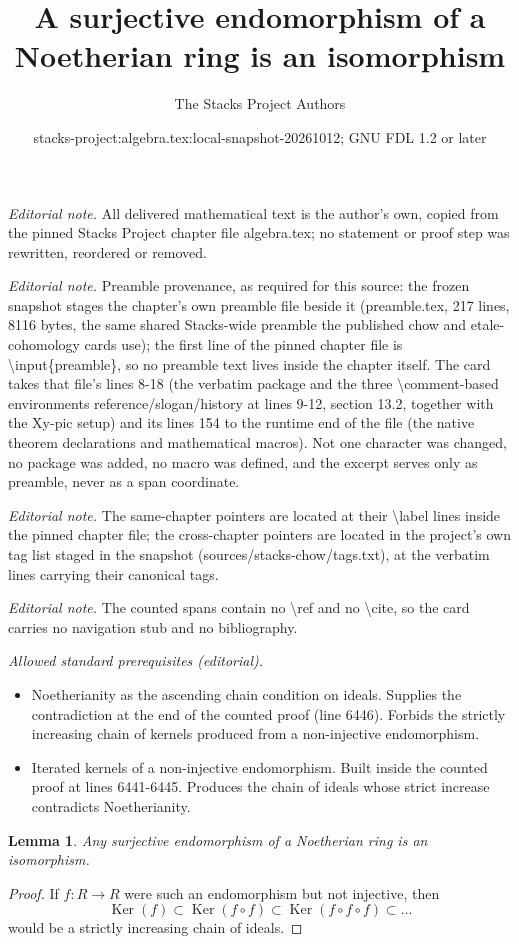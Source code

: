 \documentclass[10pt,a4paper]{amsart}
\title{A surjective endomorphism of a Noetherian ring is an isomorphism}
\author{The Stacks Project Authors}
\date{stacks-project:algebra.tex:local-snapshot-20261012; GNU FDL 1.2 or later}
\theoremstyle{plain}
\newtheorem{lemma}[subsection]{Lemma}
\theoremstyle{definition}
\theoremstyle{remark}
\numberwithin{equation}{subsection}
\def\Ker{\mathop{\mathrm{Ker}}}
\begin{document}
\maketitle
\noindent\textit{Editorial note.} All delivered mathematical text is the author's own, copied from the pinned Stacks Project chapter file algebra.tex; no statement or proof step was rewritten, reordered or removed.\par\medskip
\noindent\textit{Editorial note.} Preamble provenance, as required for this source: the frozen snapshot stages the chapter's own preamble file beside it (preamble.tex, 217 lines, 8116 bytes, the same shared Stacks-wide preamble the published chow and etale-cohomology cards use); the first line of the pinned chapter file is \textbackslash{}input\{preamble\}, so no preamble text lives inside the chapter itself. The card takes that file's lines 8-18 (the verbatim package and the three \textbackslash{}comment-based environments reference/slogan/history at lines 9-12, section 13.2, together with the Xy-pic setup) and its lines 154 to the runtime end of the file (the native theorem declarations and mathematical macros). Not one character was changed, no package was added, no macro was defined, and the excerpt serves only as preamble, never as a span coordinate.\par\medskip
\noindent\textit{Editorial note.} The same-chapter pointers are located at their \textbackslash{}label lines inside the pinned chapter file; the cross-chapter pointers are located in the project's own tag list staged in the snapshot (sources/stacks-chow/tags.txt), at the verbatim lines carrying their canonical tags.\par\medskip
\noindent\textit{Editorial note.} The counted spans contain no \textbackslash{}ref and no \textbackslash{}cite, so the card carries no navigation stub and no bibliography.\par\medskip
\noindent\textit{Allowed standard prerequisites (editorial).}\begin{itemize}
\item Noetherianity as the ascending chain condition on ideals. Supplies the contradiction at the end of the counted proof (line 6446). Forbids the strictly increasing chain of kernels produced from a non-injective endomorphism.
\item Iterated kernels of a non-injective endomorphism. Built inside the counted proof at lines 6441-6445. Produces the chain of ideals whose strict increase contradicts Noetherianity.
\end{itemize}\medskip
\begin{lemma}
\label{lemma-surjective-endo-noetherian-ring-is-iso}
Any surjective endomorphism of a Noetherian ring is an isomorphism.
\end{lemma}

\begin{proof}
If $f : R \to R$ were such an endomorphism but not injective, then
$$
\Ker(f) \subset \Ker(f \circ f) \subset
\Ker(f \circ f \circ f) \subset \ldots
$$
would be a strictly increasing chain of ideals.
\end{proof}
\end{document}
